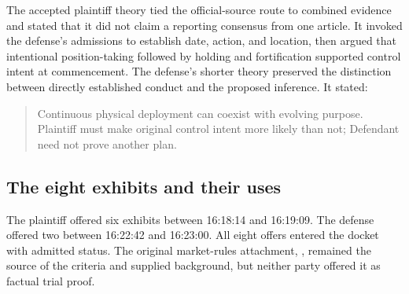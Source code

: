 The accepted plaintiff theory tied the official-source route to combined evidence and stated that it did not claim a reporting consensus from one article.  It invoked the defense's admissions to establish date, action, and location, then argued that intentional position-taking followed by holding and fortification supported control intent at commencement.  The defense's shorter theory preserved the distinction between directly established conduct and the proposed inference.  It stated:
\begin{quote}
Continuous physical deployment can coexist with evolving purpose.  Plaintiff must make original control intent more likely than not; Defendant need not prove another plan.
\end{quote}
\subsection{The eight exhibits and their uses}

The plaintiff offered six exhibits between 16:18:14 and 16:19:09.  The defense offered two between 16:22:42 and 16:23:00.  All eight offers entered the docket with admitted status.  The original market-rules attachment, , remained the source of the criteria and supplied background, but neither party offered it as factual trial proof.

